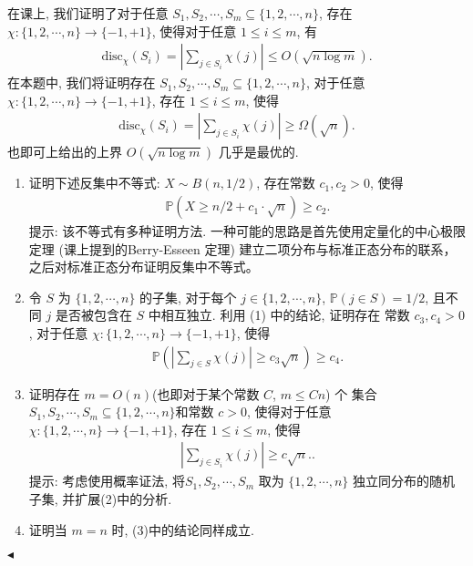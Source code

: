 \documentclass[11pt]{article}
\newenvironment{problem}[2][Problem]{\begin{trivlist}
    \item[\hskip \labelsep {\bfseries #1}\hskip \labelsep {\bfseries #2.}]\songti}{\hfill$\blacktriangleleft$\end{trivlist}}
\newcommand\1{\mathds{1}}
\newcommand\PP{\mathbb{P}}
\begin{document}
\begin{problem}{6(Bonus 30\%)}
    在课上, 我们证明了对于任意 $S_1, S_2, \cdots, S_m \subseteq \{1,2,\cdots, n\}$, 存在 $\chi: \{1,2,\cdots, n\}\to \{-1, +1\}$, 
    使得对于任意 $1\le i\le m$, 有
    \begin{align*}
        \text{disc}_{\chi}(S_i) = \left|\sum_{j\in S_i}\chi(j)\right| \le O(\sqrt{n\log m}).
    \end{align*}
    在本题中, 我们将证明存在 $S_1, S_2, \cdots, S_m \subseteq \{1,2,\cdots, n\}$, 对于任意 $\chi: \{1,2,\cdots, n\}\to \{-1, +1\}$, 
    存在 $1\le i\le m$, 使得
    \begin{align*}
        \text{disc}_{\chi}(S_i) = \left|\sum_{j\in S_i}\chi(j)\right| \ge \Omega(\sqrt{n}).
    \end{align*}
    也即可上给出的上界 $O(\sqrt{n\log m})$ 几乎是最优的.
    \begin{enumerate}[label=(\arabic*)]
        \item 证明下述反集中不等式: $X\sim B(n, 1/2)$, 存在常数 $c_1, c_2 > 0$, 使得
        \begin{align*}
            \PP(X\ge n/2 + c_1\cdot \sqrt{n}) \ge c_2.
        \end{align*}
        {\kaishu 提示: 该不等式有多种证明方法. 一种可能的思路是首先使用定量化的中心极限定理 (课上提到的Berry-Esseen 定理) 建立二项分布与标准正态分布的联系，之后对标准正态分布证明反集中不等式。}
        \item 令 $S$ 为 $\{1,2,\cdots, n\}$ 的子集, 对于每个 $j\in\{1,2,\cdots, n\}$, $\PP(j\in S) = 1/2$, 且不同 $j$ 是否被包含在 $S$ 中相互独立. 
        利用 (1) 中的结论, 证明存在 常数 $c_3, c_4>0$, 对于任意 $\chi: \{1,2,\cdots, n\}\to \{-1, +1\}$, 使得
        \begin{align*}
            \PP\left(\left|\sum_{j\in S}\chi(j)\right| \ge c_3 \sqrt{n}\right) \ge c_4.
        \end{align*}
        \item 证明存在 $m=O(n)$(也即对于某个常数 $C$, $m\le Cn$) 个 集合$S_1, S_2, \cdots, S_m \subseteq \{1,2,\cdots, n\}$和常数 $c>0$, 使得对于任意 $\chi: \{1,2,\cdots, n\}\to \{-1, +1\}$, 存在 $1\le i\le m$, 使得
        \begin{align}
            \label{eq:6.3}
            \left|\sum_{j\in S_i}\chi(j)\right| \ge c\sqrt{n}..
        \end{align}
        {\kaishu 提示: 考虑使用概率证法, 将$S_1, S_2, \cdots, S_m$ 取为 $\{1,2,\cdots,n\}$ 独立同分布的随机子集, 并扩展(2)中的分析.}
        \item 证明当 $m=n$ 时, (3)中的结论同样成立.
    \end{enumerate}
\end{problem}
\end{document}
